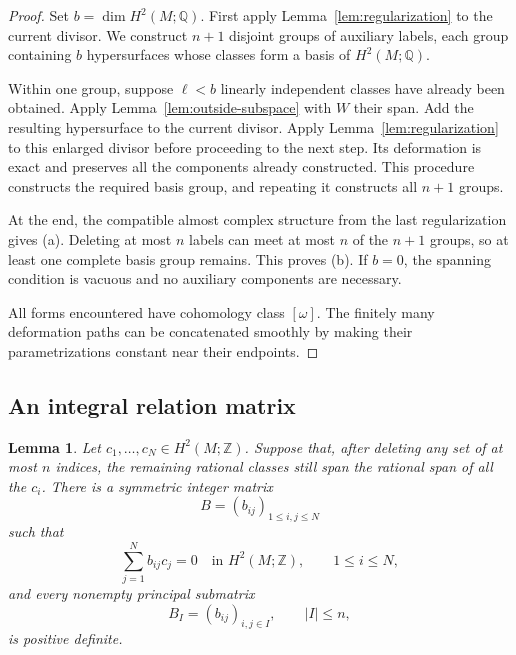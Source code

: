 \documentclass[11pt]{article}
\newtheorem{lemma}[theorem]{Lemma}
\theoremstyle{definition}
\theoremstyle{remark}
\newcommand{\Q}{\mathbb Q}
\newcommand{\Z}{\mathbb Z}
\begin{document}
\begin{proof}
Set $b=\dim H^2(M;\Q)$.  First apply
Lemma~\ref{lem:regularization} to the current divisor.
We construct $n+1$ disjoint groups of auxiliary labels, each
group containing $b$ hypersurfaces whose classes form a basis
of $H^2(M;\Q)$.

Within one group, suppose $\ell<b$ linearly independent classes
have already been obtained.  Apply
Lemma~\ref{lem:outside-subspace} with $W$ their span.  Add the
resulting hypersurface to the current divisor.  Apply
Lemma~\ref{lem:regularization} to this enlarged divisor before
proceeding to the next step.  Its deformation is exact and
preserves all the components already constructed.  This
procedure constructs the required basis group, and repeating
it constructs all $n+1$ groups.

At the end, the compatible almost complex structure from the
last regularization gives (a).  Deleting at most $n$ labels can
meet at most $n$ of the $n+1$ groups, so at least one complete
basis group remains.  This proves (b).  If $b=0$, the spanning
condition is vacuous and no auxiliary components are necessary.

All forms encountered have cohomology class $[\omega]$.
The finitely many deformation paths can be concatenated
smoothly by making their parametrizations constant near their
endpoints.
\end{proof}

\subsection{An integral relation matrix}

\begin{lemma}\label{lem:matrix}
Let $c_1,\ldots,c_N\in H^2(M;\Z)$.  Suppose that, after deleting
any set of at most $n$ indices, the remaining rational classes
still span the rational span of all the $c_i$.
There is a symmetric integer matrix
\[
B=(b_{ij})_{1\leq i,j\leq N}
\]
such that
\[
\sum_{j=1}^{N}b_{ij}c_j=0
\quad\text{in }H^2(M;\Z),\qquad 1\leq i\leq N,
\]
and every nonempty principal submatrix
\[
B_I=(b_{ij})_{i,j\in I},\qquad |I|\leq n,
\]
is positive definite.
\end{lemma}
\end{document}
